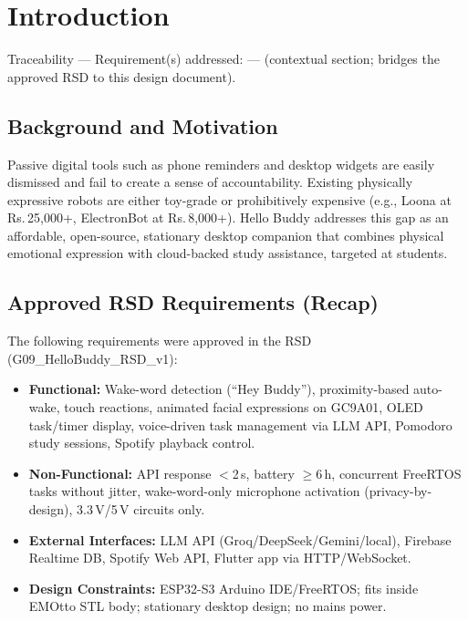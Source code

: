 \documentclass[12pt,a4paper]{article}
\begin{document}
\newpage
\section{Introduction}

\begin{tracebox}
Traceability --- Requirement(s) addressed: --- (contextual section;
bridges the approved RSD to this design document).
\end{tracebox}

\vspace{0.3cm}

\subsection{Background and Motivation}

Passive digital tools such as phone reminders and desktop widgets are
easily dismissed and fail to create a sense of accountability. Existing
physically expressive robots are either toy-grade or prohibitively
expensive (e.g., Loona at Rs.\,25{,}000+, ElectronBot at Rs.\,8{,}000+).
Hello Buddy addresses this gap as an affordable, open-source, stationary
desktop companion that combines physical emotional expression with
cloud-backed study assistance, targeted at students.

\subsection{Approved RSD Requirements (Recap)}

The following requirements were approved in the RSD
(G09\_HelloBuddy\_RSD\_v1):

\begin{itemize}[leftmargin=*]
\item \textbf{Functional:} Wake-word detection (``Hey Buddy''),
      proximity-based auto-wake, touch reactions, animated facial
      expressions on GC9A01, OLED task/timer display, voice-driven task
      management via LLM API, Pomodoro study sessions, Spotify playback
      control.
\item \textbf{Non-Functional:} API response $<$2\,s, battery
      $\geq$6\,h, concurrent FreeRTOS tasks without jitter, wake-word-only
      microphone activation (privacy-by-design), 3.3\,V/5\,V circuits
      only.
\item \textbf{External Interfaces:} LLM API (Groq/DeepSeek/Gemini/local),
      Firebase Realtime DB, Spotify Web API, Flutter app via
      HTTP/WebSocket.
\item \textbf{Design Constraints:} ESP32-S3 Arduino IDE/FreeRTOS; fits
      inside EMOtto STL body; stationary desktop design; no mains power.
\end{itemize}
\end{document}
